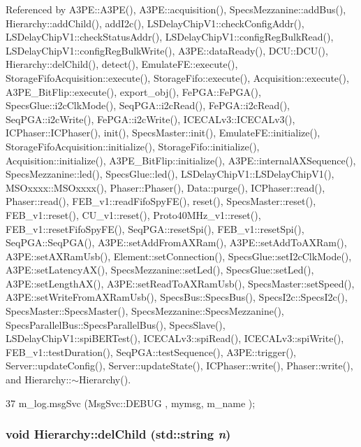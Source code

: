 Referenced by A3PE::A3PE(), A3PE::acquisition(), SpecsMezzanine::addBus(), Hierarchy::addChild(), addI2c(), LSDelayChipV1::checkConfigAddr(), LSDelayChipV1::checkStatusAddr(), LSDelayChipV1::configRegBulkRead(), LSDelayChipV1::configRegBulkWrite(), A3PE::dataReady(), DCU::DCU(), Hierarchy::delChild(), detect(), EmulateFE::execute(), StorageFifoAcquisition::execute(), StorageFifo::execute(), Acquisition::execute(), A3PE\_\-BitFlip::execute(), export\_\-obj(), FePGA::FePGA(), SpecsGlue::i2cClkMode(), SeqPGA::i2cRead(), FePGA::i2cRead(), SeqPGA::i2cWrite(), FePGA::i2cWrite(), ICECALv3::ICECALv3(), ICPhaser::ICPhaser(), init(), SpecsMaster::init(), EmulateFE::initialize(), StorageFifoAcquisition::initialize(), StorageFifo::initialize(), Acquisition::initialize(), A3PE\_\-BitFlip::initialize(), A3PE::internalAXSequence(), SpecsMezzanine::led(), SpecsGlue::led(), LSDelayChipV1::LSDelayChipV1(), MSOxxxx::MSOxxxx(), Phaser::Phaser(), Data::purge(), ICPhaser::read(), Phaser::read(), FEB\_\-v1::readFifoSpyFE(), reset(), SpecsMaster::reset(), FEB\_\-v1::reset(), CU\_\-v1::reset(), Proto40MHz\_\-v1::reset(), FEB\_\-v1::resetFifoSpyFE(), SeqPGA::resetSpi(), FEB\_\-v1::resetSpi(), SeqPGA::SeqPGA(), A3PE::setAddFromAXRam(), A3PE::setAddToAXRam(), A3PE::setAXRamUsb(), Element::setConnection(), SpecsGlue::setI2cClkMode(), A3PE::setLatencyAX(), SpecsMezzanine::setLed(), SpecsGlue::setLed(), A3PE::setLengthAX(), A3PE::setReadToAXRamUsb(), SpecsMaster::setSpeed(), A3PE::setWriteFromAXRamUsb(), SpecsBus::SpecsBus(), SpecsI2c::SpecsI2c(), SpecsMaster::SpecsMaster(), SpecsMezzanine::SpecsMezzanine(), SpecsParallelBus::SpecsParallelBus(), SpecsSlave(), LSDelayChipV1::spiBERTest(), ICECALv3::spiRead(), ICECALv3::spiWrite(), FEB\_\-v1::testDuration(), SeqPGA::testSequence(), A3PE::trigger(), Server::updateConfig(), Server::updateState(), ICPhaser::write(), Phaser::write(), and Hierarchy::$\sim$Hierarchy().


\begin{DoxyCode}
37 { m_log.msgSvc (MsgSvc::DEBUG   , mymsg, m_name ); }
\end{DoxyCode}
\hypertarget{classHierarchy_a1928ac7615fe0b5e55cd707f70dc6781}{
\subsubsection[{delChild}]{\setlength{\rightskip}{0pt plus 5cm}void Hierarchy::delChild (std::string {\em n})}}
\label{classHierarchy_a1928ac7615fe0b5e55cd707f70dc6781}


